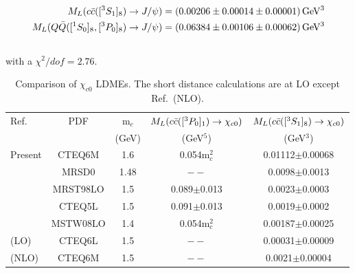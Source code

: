 \documentclass[aps,prc,preprint,superscriptaddress,showpacs,showkeys,amsmath]{revtex4-1}
\begin{document}
\begin{equation}
\begin{split}
M_{L}(c{\bar{c}}([^3S_1]_{8})\rightarrow J/\psi)&= (0.00206\pm 0.00014 \pm {\color{black}0.00001}) \,{\rm GeV^3}\\
 M_{L}(Q{\bar{Q}}([^1S_0]_{8},[^3P_0]_{8})\rightarrow J/\psi)&= (0.06384\pm 0.00106 \pm {\color{black}0.00062}) \,{\rm GeV^3} \\
~\label{eq:COLDME_JPsi}
\end{split}
\end{equation}
with a {\color{black}$\chi^2/dof=2.76$}.



\begin{table}[h]
\caption{Comparison of $\chi_{c0}$ LDMEs. The short distance calculations are at LO except Ref.~\cite{Jia:2014jfa}(NLO).}
\begin{tabular}{|l|c|c|c|c|}
\hline            
Ref.                             &PDF     &m$_{c}$      &$M_{L}(c{\bar{c}}([^3P_0]_{1})\rightarrow \chi_{c0})$                     &$M_{L}(c{\bar{c}}([^3S_1]_{8})\rightarrow \chi_{c0})$      \\        
                                &        &(GeV)       &(GeV$^5$)                        &(GeV$^3$)         \\
\hline
Present                        &CTEQ6M   &1.6         &0.054m$_{c}^{2}$                 &0.01112$\pm$0.00068\\
\cite{Cho:1995vh}              &MRSD0    &1.48        &$--$                            &0.0098$\pm$0.0013   \\
\cite{Braaten:1999qk}          &MRST98LO &1.5         &0.089$\pm$0.013                 &0.0023$\pm$0.0003    \\
\cite{Braaten:1999qk}          &CTEQ5L   &1.5         &0.091$\pm$0.013                 &0.0019$\pm$0.0002     \\
\cite{Sharma:2012dy}           &MSTW08LO &1.4         &0.054m$_{c}^{2}$                   &0.00187$\pm$0.00025     \\
\cite{Jia:2014jfa}(LO)         &CTEQ6L   &1.5         &$--$                            &0.00031$\pm$0.00009   \\ 
\cite{Jia:2014jfa}(NLO)        &CTEQ6M   &1.5         &$--$                            &0.0021$\pm$0.00004  \\ 
\hline
\end{tabular}
\label{table:LDMEChic0}
\end{table}
\end{document}
